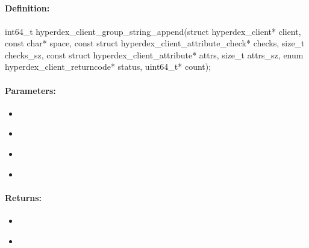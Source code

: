 \pagebreak
\subsection{}
\label{api:c:group_string_append}


\paragraph{Definition:}
\begin{ccode}
int64_t hyperdex_client_group_string_append(struct hyperdex_client* client,
        const char* space,
        const struct hyperdex_client_attribute_check* checks, size_t checks_sz,
        const struct hyperdex_client_attribute* attrs, size_t attrs_sz,
        enum hyperdex_client_returncode* status,
        uint64_t* count);
\end{ccode}

\paragraph{Parameters:}
\begin{itemize}[noitemsep]
\item {}\\

\item {}\\

\item {}\\

\item {}\\

\end{itemize}

\paragraph{Returns:}
\begin{itemize}[noitemsep]
\item {}\\

\item {}\\

\end{itemize}

